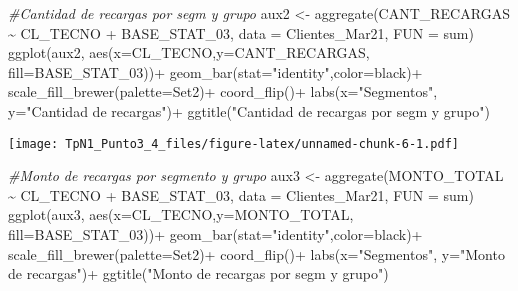 \documentclass[
]{article}
\newenvironment{Shaded}{\begin{snugshade}}{\end{snugshade}}
\newcommand{\AttributeTok}[1]{\textcolor[rgb]{0.77,0.63,0.00}{#1}}
\newcommand{\CommentTok}[1]{\textcolor[rgb]{0.56,0.35,0.01}{\textit{#1}}}
\newcommand{\FunctionTok}[1]{\textcolor[rgb]{0.00,0.00,0.00}{#1}}
\newcommand{\NormalTok}[1]{#1}
\newcommand{\OtherTok}[1]{\textcolor[rgb]{0.56,0.35,0.01}{#1}}
\newcommand{\SpecialCharTok}[1]{\textcolor[rgb]{0.00,0.00,0.00}{#1}}
\newcommand{\StringTok}[1]{\textcolor[rgb]{0.31,0.60,0.02}{#1}}
\begin{document}
\begin{Shaded}
\begin{Highlighting}[]
\CommentTok{\#Cantidad de recargas por segm y grupo}
\NormalTok{aux2 }\OtherTok{\textless{}{-}} \FunctionTok{aggregate}\NormalTok{(CANT\_RECARGAS }\SpecialCharTok{\textasciitilde{}}\NormalTok{ CL\_TECNO }\SpecialCharTok{+}\NormalTok{ BASE\_STAT\_03, }\AttributeTok{data =}\NormalTok{ Clientes\_Mar21, }\AttributeTok{FUN =}\NormalTok{ sum)}
\FunctionTok{ggplot}\NormalTok{(aux2, }\FunctionTok{aes}\NormalTok{(}\AttributeTok{x=}\NormalTok{CL\_TECNO,}\AttributeTok{y=}\NormalTok{CANT\_RECARGAS, }\AttributeTok{fill=}\NormalTok{BASE\_STAT\_03))}\SpecialCharTok{+}
  \FunctionTok{geom\_bar}\NormalTok{(}\AttributeTok{stat=}\StringTok{"identity"}\NormalTok{,}\AttributeTok{color=}\StringTok{\textquotesingle{}black\textquotesingle{}}\NormalTok{)}\SpecialCharTok{+}
  \FunctionTok{scale\_fill\_brewer}\NormalTok{(}\AttributeTok{palette=}\StringTok{\textquotesingle{}Set2\textquotesingle{}}\NormalTok{)}\SpecialCharTok{+}
  \FunctionTok{coord\_flip}\NormalTok{()}\SpecialCharTok{+}
  \FunctionTok{labs}\NormalTok{(}\AttributeTok{x=}\StringTok{"Segmentos"}\NormalTok{,  }\AttributeTok{y=}\StringTok{"Cantidad de recargas"}\NormalTok{)}\SpecialCharTok{+}
  \FunctionTok{ggtitle}\NormalTok{(}\StringTok{"Cantidad de recargas por segm y grupo"}\NormalTok{)}
\end{Highlighting}
\end{Shaded}

\texttt{[image: TpN1\_Punto3\_4\_files/figure-latex/unnamed-chunk-6-1.pdf]}

\begin{Shaded}
\begin{Highlighting}[]
\CommentTok{\#Monto de recargas por segmento y grupo}
\NormalTok{aux3 }\OtherTok{\textless{}{-}} \FunctionTok{aggregate}\NormalTok{(MONTO\_TOTAL }\SpecialCharTok{\textasciitilde{}}\NormalTok{ CL\_TECNO }\SpecialCharTok{+}\NormalTok{ BASE\_STAT\_03, }\AttributeTok{data =}\NormalTok{ Clientes\_Mar21, }\AttributeTok{FUN =}\NormalTok{ sum)}
\FunctionTok{ggplot}\NormalTok{(aux3, }\FunctionTok{aes}\NormalTok{(}\AttributeTok{x=}\NormalTok{CL\_TECNO,}\AttributeTok{y=}\NormalTok{MONTO\_TOTAL, }\AttributeTok{fill=}\NormalTok{BASE\_STAT\_03))}\SpecialCharTok{+}
  \FunctionTok{geom\_bar}\NormalTok{(}\AttributeTok{stat=}\StringTok{"identity"}\NormalTok{,}\AttributeTok{color=}\StringTok{\textquotesingle{}black\textquotesingle{}}\NormalTok{)}\SpecialCharTok{+}
  \FunctionTok{scale\_fill\_brewer}\NormalTok{(}\AttributeTok{palette=}\StringTok{\textquotesingle{}Set2\textquotesingle{}}\NormalTok{)}\SpecialCharTok{+}
  \FunctionTok{coord\_flip}\NormalTok{()}\SpecialCharTok{+}
  \FunctionTok{labs}\NormalTok{(}\AttributeTok{x=}\StringTok{"Segmentos"}\NormalTok{,  }\AttributeTok{y=}\StringTok{"Monto de recargas"}\NormalTok{)}\SpecialCharTok{+}
  \FunctionTok{ggtitle}\NormalTok{(}\StringTok{"Monto de recargas por segm y grupo"}\NormalTok{)}
\end{Highlighting}
\end{Shaded}
\end{document}
